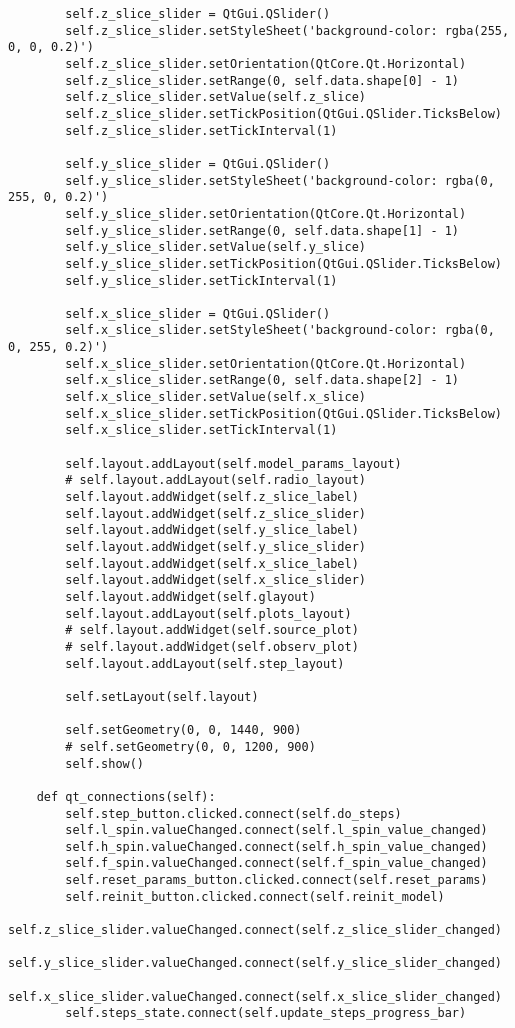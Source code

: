 \documentclass[../main.tex]{subfiles}
\begin{document}
\begin{lstlisting}
        self.z_slice_slider = QtGui.QSlider()
        self.z_slice_slider.setStyleSheet('background-color: rgba(255, 0, 0, 0.2)')
        self.z_slice_slider.setOrientation(QtCore.Qt.Horizontal)
        self.z_slice_slider.setRange(0, self.data.shape[0] - 1)
        self.z_slice_slider.setValue(self.z_slice)
        self.z_slice_slider.setTickPosition(QtGui.QSlider.TicksBelow)
        self.z_slice_slider.setTickInterval(1)
        
        self.y_slice_slider = QtGui.QSlider()
        self.y_slice_slider.setStyleSheet('background-color: rgba(0, 255, 0, 0.2)')
        self.y_slice_slider.setOrientation(QtCore.Qt.Horizontal)
        self.y_slice_slider.setRange(0, self.data.shape[1] - 1)
        self.y_slice_slider.setValue(self.y_slice)
        self.y_slice_slider.setTickPosition(QtGui.QSlider.TicksBelow)
        self.y_slice_slider.setTickInterval(1)

        self.x_slice_slider = QtGui.QSlider()
        self.x_slice_slider.setStyleSheet('background-color: rgba(0, 0, 255, 0.2)')
        self.x_slice_slider.setOrientation(QtCore.Qt.Horizontal)
        self.x_slice_slider.setRange(0, self.data.shape[2] - 1)
        self.x_slice_slider.setValue(self.x_slice)
        self.x_slice_slider.setTickPosition(QtGui.QSlider.TicksBelow)
        self.x_slice_slider.setTickInterval(1)

        self.layout.addLayout(self.model_params_layout)
        # self.layout.addLayout(self.radio_layout)
        self.layout.addWidget(self.z_slice_label)
        self.layout.addWidget(self.z_slice_slider)
        self.layout.addWidget(self.y_slice_label)
        self.layout.addWidget(self.y_slice_slider)
        self.layout.addWidget(self.x_slice_label)
        self.layout.addWidget(self.x_slice_slider)
        self.layout.addWidget(self.glayout)
        self.layout.addLayout(self.plots_layout)
        # self.layout.addWidget(self.source_plot)
        # self.layout.addWidget(self.observ_plot)
        self.layout.addLayout(self.step_layout)

        self.setLayout(self.layout)

        self.setGeometry(0, 0, 1440, 900)
        # self.setGeometry(0, 0, 1200, 900)
        self.show()

    def qt_connections(self):
        self.step_button.clicked.connect(self.do_steps)
        self.l_spin.valueChanged.connect(self.l_spin_value_changed)
        self.h_spin.valueChanged.connect(self.h_spin_value_changed)
        self.f_spin.valueChanged.connect(self.f_spin_value_changed)
        self.reset_params_button.clicked.connect(self.reset_params)
        self.reinit_button.clicked.connect(self.reinit_model)
        self.z_slice_slider.valueChanged.connect(self.z_slice_slider_changed)
        self.y_slice_slider.valueChanged.connect(self.y_slice_slider_changed)
        self.x_slice_slider.valueChanged.connect(self.x_slice_slider_changed)
        self.steps_state.connect(self.update_steps_progress_bar)


\end{lstlisting}
\end{document}
